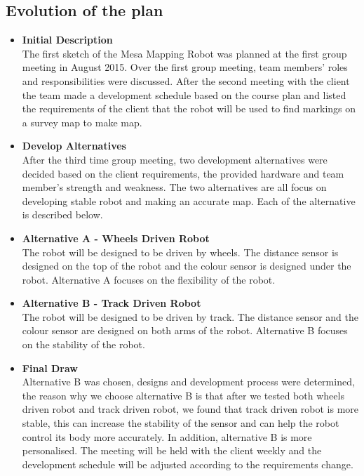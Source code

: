 \documentclass[11pt, a4paper]{article}
\begin{document}
\subsection{Evolution of the plan}
\begin{itemize}
\item{\bfseries Initial Description}\\
The first sketch of the Mesa Mapping Robot was planned at the first group meeting in August 2015. Over the first group meeting, team members' roles and responsibilities were discussed. After the second meeting with the client the team made a development schedule based on the course plan and listed the requirements of the client that the robot will be used to find markings on a survey map to make map.
\item{\bfseries Develop Alternatives}\\
After the third time group meeting, two development alternatives were decided based on the client requirements, the provided hardware and team member's strength and weakness. The two alternatives are all focus on developing stable robot and making an accurate map. Each of the alternative is described below.
\item{\bfseries Alternative A - Wheels Driven Robot}\\
The robot will be designed to be driven by wheels. The distance sensor is designed on the top of the robot and the colour sensor is designed under the robot. Alternative A focuses on the flexibility of the robot.
\item{\bfseries Alternative B - Track Driven Robot}\\
The robot will be designed to be driven by track. The distance sensor and the colour sensor are designed on both arms of the robot. Alternative B focuses on the stability of the robot.
\item{\bfseries Final Draw}\\
Alternative B was chosen, designs and development process were determined, the reason why we choose alternative B is that after we tested both wheels driven robot and track driven robot, we found that track driven robot is more stable, this can increase the stability of the sensor and can help the robot control its body more accurately. In addition, alternative B is more personalised. The meeting will be held with the client weekly and the development schedule will be adjusted according to the requirements change.
\end{itemize}

\end{document}
